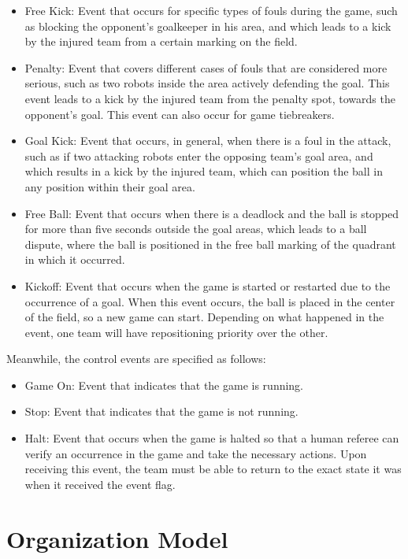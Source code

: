 \begin{itemize}
    \item Free Kick: Event that occurs for specific types of fouls during the game, such as blocking the opponent's goalkeeper in his area, and which leads to a kick by the injured team from a certain marking on the field.
    \item Penalty: Event that covers different cases of fouls that are considered more serious, such as two robots inside the area actively defending the goal. This event leads to a kick by the injured team from the penalty spot, towards the opponent's goal. This event can also occur for game tiebreakers.
    \item Goal Kick: Event that occurs, in general, when there is a foul in the attack, such as if two attacking robots enter the opposing team's goal area, and which results in a kick by the injured team, which can position the ball in any position within their goal area.
    \item Free Ball: Event that occurs when there is a deadlock and the ball is stopped for more than five seconds outside the goal areas, which leads to a ball dispute, where the ball is positioned in the free ball marking of the quadrant in which it occurred.
    \item Kickoff: Event that occurs when the game is started or restarted due to the occurrence of a goal. When this event occurs, the ball is placed in the center of the field, so a new game can start. Depending on what happened in the event, one team will have repositioning priority over the other.
\end{itemize}

Meanwhile, the control events are specified as follows:

\begin{itemize}
    \item Game On: Event that indicates that the game is running.
    \item Stop: Event that indicates that the game is not running.
    \item Halt: Event that occurs when the game is halted so that a human referee can verify an occurrence in the game and take the necessary actions. Upon receiving this event, the team must be able to return to the exact state it was when it received the event flag.
\end{itemize}

\section{Organization Model}
\label{sec:organization_model}

